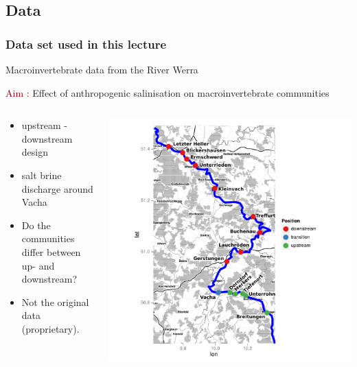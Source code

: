 \documentclass[10pt]{beamer}\usepackage[]{graphicx}\usepackage[]{color}
\begin{document}
\subsection{Data}
\begin{frame}
  \frametitle{Data set used in this lecture}
  Macroinvertebrate data from the River Werra\footnotemark {}

  \textcolor{darkred}{Aim :} Effect of anthropogenic salinisation on macroinvertebrate communities 

  \begin{columns}
  \begin{column}{5cm}
    \begin{itemize}
      \item upstream - downstream design
      \item salt brine discharge around Vacha
      \item Do the communities differ between up- and downstream?
      \item Not the original data (proprietary).
    \end{itemize}
  \end{column}
  \begin{column}{5cm}
      \includegraphics[height=0.7\textheight]{pics/map.pdf}
      \footnotemark
\end{column}
\end{columns}
\end{frame}
\end{document}
